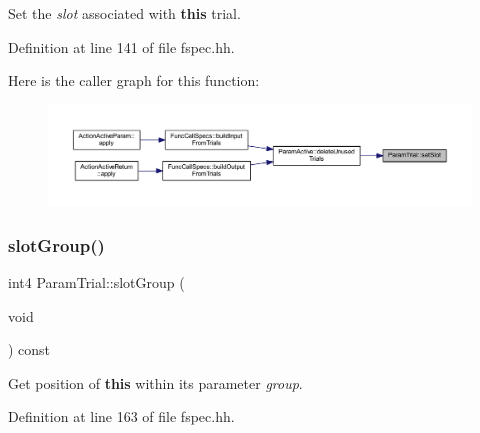 Set the {\itshape slot} associated with {\bfseries{this}} trial. 



Definition at line 141 of file fspec.\+hh.

Here is the caller graph for this function\+:
\nopagebreak
\begin{figure}[H]
\begin{center}
\leavevmode
\includegraphics[width=350pt]{class_param_trial_a64a57d4768366a15b920f0670ad2e83d_icgraph}
\end{center}
\end{figure}
\mbox{\label{class_param_trial_a827f24578c88cbcd001d49ac820c12c2}} 
\subsubsection{\texorpdfstring{slotGroup()}{slotGroup()}}
{\footnotesize\ttfamily int4 Param\+Trial\+::slot\+Group (\begin{DoxyParamCaption}\item[{void}]{ }\end{DoxyParamCaption}) const\hspace{0.3cm}{\ttfamily [inline]}}



Get position of {\bfseries{this}} within its parameter {\itshape group}. 



Definition at line 163 of file fspec.\+hh.

